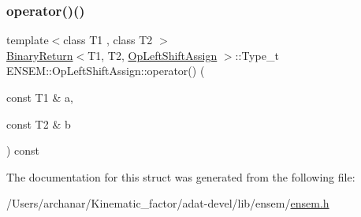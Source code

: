 \subsubsection{\texorpdfstring{operator()()}{operator()()}\hspace{0.1cm}{\footnotesize\ttfamily [3/3]}}
{\footnotesize\ttfamily template$<$class T1 , class T2 $>$ \\
\mbox{\hyperlink{structENSEM_1_1BinaryReturn}{Binary\+Return}}$<$T1, T2, \mbox{\hyperlink{structENSEM_1_1OpLeftShiftAssign}{Op\+Left\+Shift\+Assign}} $>$\+::Type\+\_\+t E\+N\+S\+E\+M\+::\+Op\+Left\+Shift\+Assign\+::operator() (\begin{DoxyParamCaption}\item[{const T1 \&}]{a,  }\item[{const T2 \&}]{b }\end{DoxyParamCaption}) const\hspace{0.3cm}{\ttfamily [inline]}}



The documentation for this struct was generated from the following file\+:\begin{DoxyCompactItemize}
\item 
/\+Users/archanar/\+Kinematic\+\_\+factor/adat-\/devel/lib/ensem/\mbox{\hyperlink{adat-devel_2lib_2ensem_2ensem_8h}{ensem.\+h}}\end{DoxyCompactItemize}
